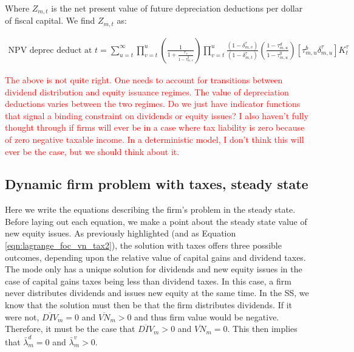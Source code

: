 \documentclass[letterpaper,12pt]{article}
\theoremstyle{definition}
\begin{document}
\begin{spacing}{1.5}
Where $Z_{m,t}$ is the net present value of future depreciation deductions per dollar of fiscal capital.  We find $Z_{m,t}$ as:

\begin{equation}
\label{eqn:NPV_deprec}
\begin{split}
\text{NPV deprec deduct at $t$} = \sum_{u=t}^{\infty} \prod_{v=t}^{u} \left(\frac{1}{1+\frac{r_{v}}{1-\tau^{g}_{m,v}}} \right) \prod_{v=t}^{u}\frac{(1-\delta^{\tau}_{m,v})}{(1-\delta^{\tau}_{m,t})} \left(\frac{1-\tau^{d}_{m,u}}{1-\tau^{g}_{m,u}}  \right) \left[ \tau^{b}_{m,u}\delta^{\tau}_{m,u} \right]K^{\tau}_{t}
\end{split}
\end{equation}

\textcolor{red}{The above is not quite right.  One needs to account for transitions between dividend distribution and equity issuance regimes.  The value of depreciation deductions varies between the two regimes.  Do we just have indicator functions that signal a binding constraint on dividends or equity issues?  I also haven't fully thought through if firms will ever be in a case where tax liability is zero because of zero negative taxable income.  In a deterministic model, I don't think this will ever be the case, but we should think about it.}

\subsection*{Dynamic firm problem with taxes, steady state}

Here we write the equations describing the firm's problem in the steady state.  Before laying out each equation, we make a point about the steady state value of new equity issues.  As previously highlighted (and as Equation \ref{eqn:lagrange_foc_vn_tax2}), the solution with taxes offers three possible outcomes, depending upon the relative value of capital gains and dividend taxes.  The mode only has a unique solution for dividends and new equity issues in the case of capital gains taxes being less than dividend taxes.  In this case, a firm never distributes dividends and issues new equity at the same time.  In the SS, we know that the solution must then be that the firm distributes dividends.  If it were not, $\overline{DIV}_{m}=0$ and $\overline{VN}_{m}>0$ and thus firm value would be negative.  Therefore, it must be the case that $\overline{DIV}_{m}>0$ and $\overline{VN}_{m}=0$.  This then implies that $\bar{\lambda}^{d}_{m}=0$ and $\bar{\lambda}^{v}_{m}>0$.




\end{spacing}
\end{document}
